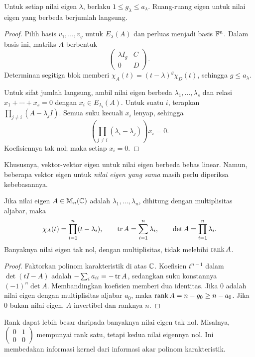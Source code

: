 \begin{teorema}
    Untuk setiap nilai eigen $\lambda$, berlaku
    $1\le g_\lambda\le a_\lambda$.
    Ruang-ruang eigen untuk nilai eigen yang berbeda berjumlah langsung.
\end{teorema}
\begin{proof}
    Pilih basis $v_1,\ldots,v_g$ untuk $E_\lambda(A)$ dan perluas
    menjadi basis $\mathbb{F}^n$. Dalam basis ini, matriks $A$ berbentuk
    \[
        \begin{pmatrix}\lambda I_g&C\\0&D\end{pmatrix}.
    \]
    Determinan segitiga blok memberi
    $\chi_A(t)=(t-\lambda)^g\chi_D(t)$, sehingga $g\le a_\lambda$.

    Untuk sifat jumlah langsung, ambil nilai eigen berbeda
    $\lambda_1,\ldots,\lambda_s$ dan relasi
    $x_1+\cdots+x_s=0$ dengan $x_i\in E_{\lambda_i}(A)$.
    Untuk suatu $i$, terapkan $\prod_{j\ne i}(A-\lambda_jI)$.
    Semua suku kecuali $x_i$ lenyap, sehingga
    \[
        \left(\prod_{j\ne i}(\lambda_i-\lambda_j)\right)x_i=0.
    \]
    Koefisiennya tak nol; maka setiap $x_i=0$.
\end{proof}

Khususnya, vektor-vektor eigen untuk nilai eigen berbeda bebas linear.
Namun, beberapa vektor eigen untuk \emph{nilai eigen yang sama}
masih perlu diperiksa kebebasannya.

\begin{prop}
    \label{eigen:trace-det}
    Jika nilai eigen $A\in\mathbb{M}_n(\mathbb{C})$ adalah
    $\lambda_1,\ldots,\lambda_n$, dihitung dengan multiplisitas aljabar,
    maka
    \[
        \chi_A(t)=\prod_{i=1}^n(t-\lambda_i),\qquad
        \operatorname{tr} A=\sum_{i=1}^n\lambda_i,\qquad
        \det A=\prod_{i=1}^n\lambda_i.
    \]
    Banyaknya nilai eigen tak nol, dengan multiplisitas, tidak melebihi
    $\operatorname{rank} A$.
\end{prop}
\begin{proof}
    Faktorkan polinom karakteristik di atas $\mathbb{C}$.
    Koefisien $t^{n-1}$ dalam $\det(tI-A)$ adalah
    $-\sum_i a_{ii}=-\operatorname{tr} A$, sedangkan suku konstannya $(-1)^n\det A$.
    Membandingkan koefisien memberi dua identitas.
    Jika $0$ adalah nilai eigen dengan multiplisitas aljabar $a_0$,
    maka $\operatorname{rank} A=n-g_0\ge n-a_0$.
    Jika $0$ bukan nilai eigen, $A$ invertibel dan ranknya $n$.
\end{proof}

Rank dapat lebih besar daripada banyaknya nilai eigen tak nol.
Misalnya, $\begin{pmatrix}0&1\\0&0\end{pmatrix}$ mempunyai rank satu,
tetapi kedua nilai eigennya nol. Ini membedakan informasi kernel dari
informasi akar polinom karakteristik.


